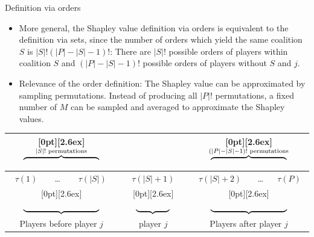\documentclass[10pt,compress,t,notes=noshow, xcolor=table]{beamer}
\begin{document}
\begin{vbframe}{Definition via orders}
\begin{itemize}
  \item More general, the Shapley value definition via orders is equivalent to the definition via sets, since the number of orders which yield the same coalition $S$ is  $|S|!(|P| - |S| - 1)!$: There are $|S|!$ possible orders of players within coalition $S$ and $(|P| - |S| - 1)!$ possible orders of players without $S$ and $j$.
  \item Relevance of the order definition: The Shapley value can be approximated by sampling permutations. Instead of producing all $|P|!$ permutations, a fixed number of $M$ can be sampled and averaged to approximate the Shapley values.
\end{itemize}

  \begin{tabular}{|c|c|c|c|c|c|c|}
    \multicolumn{3}{c}{\enspace\raisebox{-3.3ex}[0pt][2.6ex]{$ \overbrace{\vphantom{-}\hspace{9em}}^{|S|! \text{ permutations}}$}} &
    \multicolumn{1}{c}{} &
    \multicolumn{3}{c}{\enspace\raisebox{-3.3ex}[0pt][2.6ex]{$ \overbrace{\vphantom{-}\hspace{9em}}^{(|P| - |S| - 1)! \text{ permutations}}$}}\\
    \hline
    $\tau(1)$ & \ldots & $\tau(|S|)$ & $\tau(|S| + 1)$ & $\tau(|S| + 2)$ & \ldots & $\tau(P)$ \\
    \hline
    \multicolumn{3}{c}{\enspace\raisebox{1.3ex}[0pt][2.6ex]{$ \underbrace{\vphantom{-}\hspace{9em}}^{}$}} &
    \multicolumn{1}{c}{\enspace\raisebox{1.3ex}[0pt][2.6ex]{$ \underbrace{\vphantom{-}\hspace{4em}}^{}$}} &
    \multicolumn{3}{c}{\enspace\raisebox{1.3ex}[0pt][2.6ex]{$ \underbrace{\vphantom{-}\hspace{9em}}^{}$}}\\
    \multicolumn{3}{c}{Players before player $j$} & \multicolumn{1}{c}{player $j$} & \multicolumn{3}{c}{Players after player $j$} \\
  \end{tabular}


\end{vbframe}
\end{document}
